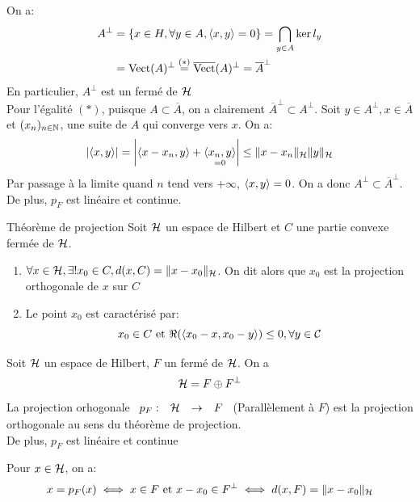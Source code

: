 \documentclass[]{report}
\begin{document}
    \begin{re}{}{}
        On a:
        \begin{align*}
            A^{\perp}&=\{x\in H,\forall y\in A,\langle x,y \rangle=0\}=\bigcap_{y\in A}\ker l_y\\
            &=\text{Vect}(A)^{\perp}\overset{(*)}{=}\overline{\text{Vect}}(A)^\perp=\overline{A}^\perp
        \end{align*}
        En particulier, $A^\perp$ est un \sev fermé de $\mathcal{H}$\\
        Pour l'égalité $(*)$, puisque $A\subset \overline{A}$, on a clairement $\overline{A}^\perp \subset A^\perp$. Soit $y\in A^\perp,x\in \overline{A}$ et $(x_n)_{n\in\mathbb{N}}$, une suite de $A$ qui converge vers $x$. On a:
        \[\left|\langle x,y \rangle\right|=\left|\langle x-x_n,y \rangle+\underset{=0}{\langle x_n,y \rangle}\right|\le \lVert x-x_n \rVert_{\mathcal{H}}\lVert y \rVert_{\mathcal{H}}\]
        Par passage à la limite quand $n$ tend vers $+\infty$, $\langle x,y \rangle=0$. On a donc $A^\perp \subset \overline{A}^\perp$. De plus, $p_F$ est linéaire et continue.
    \end{re}

    \begin{tm}{Théorème de projection}{}
        Soit $\mathcal{H}$ un espace de Hilbert et $C$ une partie convexe fermée de $\mathcal{H}$.
        \begin{enumerate}
            \item $\forall x\in \mathcal{H},\exists ! x_0\in C, d(x,C)=\lVert x-x_0 \rVert_{\mathcal{H}}$. On dit alors que $x_0$ est la projection orthogonale de $x$ sur $C$
            \item Le point $x_0$ est caractérisé par:
            \[ x_0\in C\text{ et }\Re(\langle x_0-x,x_0-y \rangle)\le 0,\forall y\in \mathcal{C}\]
        \end{enumerate}
    \end{tm}

    \begin{prop}{}{}
        Soit $\mathcal{H}$ un espace de Hilbert, $F$ un \sev fermé de $\mathcal{H}$. On a
        \[\mathcal{H}=F\oplus F^{\perp}\]
        La projection orhogonale $\begin{array}{ccccc} p_F : & \mathcal{H} & \to & F \end{array}$ (Parallèlement à $F$) est la projection orthogonale au sens du théorème de projection.\\
        De plus, $p_F$ est linéaire et continue
    \end{prop}

    \begin{re}{}{}
        Pour $x\in \mathcal{H}$, on a:
        \[x=p_F(x)\iff x\in F\text{ et }x-x_0\in F^\perp\iff d(x,F)=\lVert x-x_0 \rVert_{\mathcal{H}}\]
    \end{re}
\end{document}
